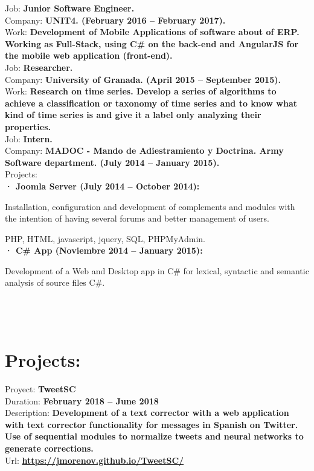 \documentclass	[10pt,a4paper,oneside]{article}
\newcommand{\seccion}[1]{\vspace*{3mm}\section*{#1}\vspace*{-3mm}}
\begin{document}
Job: \textbf{Junior Software Engineer.}\\
Company: \textbf{UNIT4. (February 2016 – February 2017).}\\
Work: \textbf{Development of Mobile Applications of software about of ERP. Working as Full-Stack, using C\# on the back-end and AngularJS for the mobile web application (front-end).}\\

Job: \textbf{Researcher.}\\
Company: \textbf{University of Granada. (April 2015 – September 2015).}\\
Work: \textbf{Research on time series. Develop a series of algorithms to achieve a classification or taxonomy of time series and to know what kind of time series is and give it a label only analyzing their properties.}\\

Job: \textbf{Intern.}\\
Company: \textbf{MADOC - Mando de Adiestramiento y Doctrina. Army Software department. (July 2014 – January 2015).}\\
Projects:\\
\hspace*{1cm}\textbf{· Joomla Server (July 2014 – October 2014):}\par
{\addtolength{\leftskip}{2cm}Installation, configuration and development of complements and modules with the intention of having several forums and better management of users.\par}
\hspace*{2cm}PHP, HTML, javascript, jquery, SQL, PHPMyAdmin.\\
\hspace*{1cm}\textbf{· C\# App (Noviembre 2014 – January 2015):}\par
{\addtolength{\leftskip}{2cm}
Development of a Web and Desktop app in C\# for lexical, syntactic and semantic analysis of source files C\#.\\\\\\\\\par}

\seccion{Projects:}

Proyect: \textbf{TweetSC}\\
Duration: \textbf{February 2018 – June 2018}\\
Description: \textbf{Development of a text corrector with a web application with text corrector functionality for messages in Spanish on Twitter. Use of sequential modules to normalize tweets and neural networks to generate corrections.}\\
Url: \textbf{\url{https://jmorenov.github.io/TweetSC/}}\\
\end{document}
